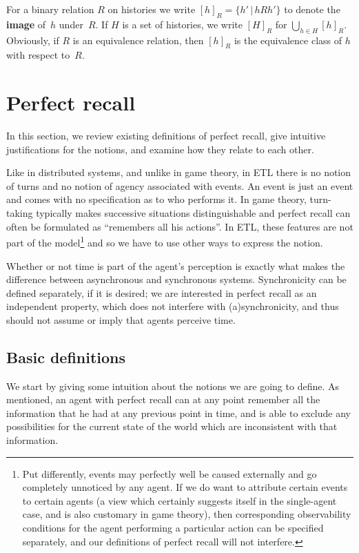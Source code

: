 \documentclass{article}
\def\dfn{\textbf}
\newcommand{\suchthat}{\,|\,}
\newcounter{#1}
\begin{document}
For a binary relation $R$ on histories
we write $[h]_R=\{h'\suchthat hRh'\}$ to denote the \dfn{image} of~$h$ under~$R$.
If $H$ is a set of histories, we write $[H]_R$ for $\bigcup_{h\in H}[h]_R$.
Obviously, if $R$ is an equivalence relation, then $[h]_R$ is the equivalence class of $h$ with respect to~$R$.

\section{Perfect recall}
\label{sec:defin-perf-recall}

In this section, we review existing definitions of perfect recall,
give intuitive justifications for the notions,
and examine how they relate to each other.

Like in distributed systems, and unlike in game theory,
in ETL there is no notion of turns and no notion of agency associated with events.
An event is just an event and comes with no specification as to who performs it.
In game theory, turn-taking typically makes successive situations distinguishable
and perfect recall can often be formulated as ``remembers all his actions''.
In ETL, these features are not part of the model\footnote{Put differently,
events may perfectly well be caused externally and go completely unnoticed by any agent.
If we do want to attribute certain events to certain agents
(a view which certainly suggests itself in the single-agent case,
and is also customary in game theory),
then corresponding observability conditions for the agent performing a particular action
can be specified separately,
and our definitions of perfect recall will not interfere.}
and so we have to use other ways to express the notion.

Whether or not time is part of the agent's perception
is exactly what makes the difference between asynchronous and synchronous systems.
Synchronicity can be defined separately, if it is desired;
we are interested in perfect recall as an independent property,
which does not interfere with (a)synchronicity,
and thus should not assume or imply that agents perceive time.

\subsection{Basic definitions}
\label{sec:basic-definitions}

We start by giving some intuition about the notions we are going to define.
As mentioned, an agent with perfect recall can at any point
remember all the information that he had at any previous point in time,
and is able to exclude any possibilities for the current state of the world
which are inconsistent with that information.
\end{document}
